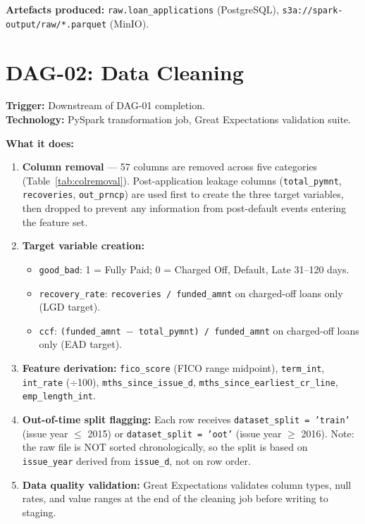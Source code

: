 \documentclass[12pt,a4paper]{report}
\begin{document}
\textbf{Artefacts produced:} \texttt{raw.loan\_applications} (PostgreSQL), \texttt{s3a://spark-output/raw/*.parquet} (MinIO).

\section{DAG-02: Data Cleaning}

\textbf{Trigger:} Downstream of DAG-01 completion.\\
\textbf{Technology:} PySpark transformation job, Great Expectations validation suite.

\textbf{What it does:}
\begin{enumerate}
  \item \textbf{Column removal} --- 57 columns are removed across five categories (Table~\ref{tab:colremoval}). Post-application leakage columns (\texttt{total\_pymnt}, \texttt{recoveries}, \texttt{out\_prncp}) are used first to create the three target variables, then dropped to prevent any information from post-default events entering the feature set.
  \item \textbf{Target variable creation:}
  \begin{itemize}
    \item \texttt{good\_bad}: 1 = Fully Paid; 0 = Charged Off, Default, Late 31--120 days.
    \item \texttt{recovery\_rate}: \texttt{recoveries / funded\_amnt} on charged-off loans only (LGD target).
    \item \texttt{ccf}: \texttt{(funded\_amnt $-$ total\_pymnt) / funded\_amnt} on charged-off loans only (EAD target).
  \end{itemize}
  \item \textbf{Feature derivation:} \texttt{fico\_score} (FICO range midpoint), \texttt{term\_int}, \texttt{int\_rate} ($\div$100), \texttt{mths\_since\_issue\_d}, \texttt{mths\_since\_earliest\_cr\_line}, \texttt{emp\_length\_int}.
  \item \textbf{Out-of-time split flagging:} Each row receives \texttt{dataset\_split = 'train'} (issue year $\leq$ 2015) or \texttt{dataset\_split = 'oot'} (issue year $\geq$ 2016). Note: the raw file is NOT sorted chronologically, so the split is based on \texttt{issue\_year} derived from \texttt{issue\_d}, not on row order.
  \item \textbf{Data quality validation:} Great Expectations validates column types, null rates, and value ranges at the end of the cleaning job before writing to staging.
\end{enumerate}
\end{document}
